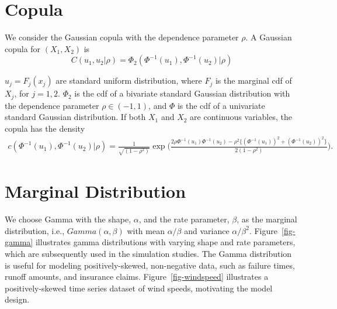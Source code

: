 \documentclass[
  letterpaper,
  double,
  12pt,
  1.0in]{beavtex}
\begin{document}
\section{Copula}\label{sec-ch1-prop-copula}

We consider the Gaussian copula with the dependence parameter \(\rho\).
A Gaussian copula for \((X_1, X_2)\) is \begin{equation}
    C(u_1, u_2 |  \rho) = \Phi_2 (\Phi^{-1} (u_1),  \Phi^{-1} (u_2) | \rho)
\end{equation}

\(u_j = F_j(x_j)\) are standard uniform distribution, where \(F_j\) is
the marginal cdf of \(X_j\), for \(j = 1,2\). \(\Phi_2\) is the cdf of a
bivariate standard Gaussian distribution with the dependence parameter
\(\rho \in (-1, 1)\), and \(\Phi\) is the cdf of a univariate standard
Gaussian distribution. If both \(X_1\) and \(X_2\) are continuous
variables, the copula has the density \begin{equation}
\begin{split}
    c(\Phi^{-1} (u_1), \Phi^{-1} (u_2) | \rho) = \frac{1} {\sqrt{(1 - \rho^2)}} \exp{\Biggl( \frac{2 \rho \Phi^{-1} (u_1) \Phi^{-1} (u_2) - \rho^2\{ {(\Phi^{-1} (u_1))}^2 + {(\Phi^{-1} (u_2))}^2 \}} {2 (1 - \rho^2)} \Biggr)}.
\end{split}
\end{equation}

\section{Marginal Distribution}\label{marginal-distribution}

We choose Gamma with the shape, \(\alpha\), and the rate parameter,
\(\beta\), as the marginal distribution, i.e., \(Gamma (\alpha, \beta)\)
with mean \(\alpha / \beta\) and variance \(\alpha / \beta^2\).
Figure~\ref{fig-gamma} illustrates gamma distributions with varying
shape and rate parameters, which are subsequently used in the simulation
studies. The Gamma distribution is useful for modeling
positively-skewed, non-negative data, such as failure times, runoff
amounts, and insurance claims. Figure~\ref{fig-windspeed} illustrates a
positively-skewed time series dataset of wind speeds, motivating the
model design.
\end{document}
